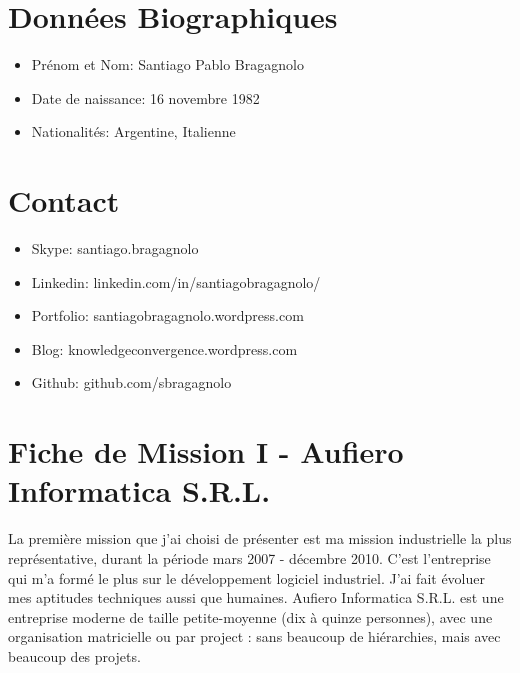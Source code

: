 \documentclass{resume} %
\begin{document}
\section{Donn\'{e}es Biographiques}

\begin{itemize}
	\item Pr\'enom et Nom: Santiago Pablo Bragagnolo  
	\item Date de naissance: 16 novembre 1982  
	\item Nationalités: Argentine, Italienne  
\end{itemize}



\section{Contact}

\begin{itemize}
	\item Skype: santiago.bragagnolo  
	\item Linkedin: linkedin.com/in/santiagobragagnolo/  
	\item Portfolio: santiagobragagnolo.wordpress.com  
	\item Blog: knowledgeconvergence.wordpress.com  
	\item Github: github.com/sbragagnolo 
\end{itemize}




\section{Fiche de Mission I - Aufiero Informatica S.R.L.}



	La premi\`ere mission que j'ai choisi de pr\'esenter est ma mission industrielle la plus repr\'esentative, durant la période mars 2007 - décembre 2010. C'est l'entreprise qui m'a form\'e le plus sur le développement logiciel industriel. J'ai fait évoluer mes aptitudes techniques aussi que humaines. 
	Aufiero Informatica S.R.L. est une entreprise moderne de taille petite-moyenne (dix \`a quinze personnes), avec une organisation matricielle ou par project : sans beaucoup de hiérarchies, mais avec beaucoup des projets. 
\end{document}
